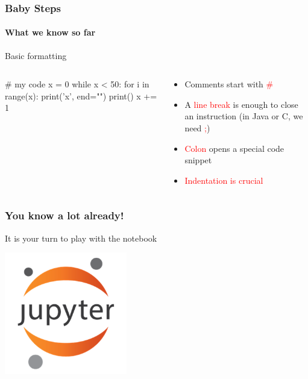 \documentclass{beamer}
\newcommand{\red}[1]{\textcolor{red}{#1}}
\begin{document}
\begin{frame}[fragile]
\frametitle{Baby Steps}
\framesubtitle{What we know so far}

\alert{Basic formatting}

\begin{columns}
\begin{column}{0.4\textwidth}
\begin{python}
# my code
x = 0            
while x < 50:
	for i in range(x):  
		print('x', end="")
	print()
	x += 1
\end{python}
\end{column}

\begin{column}{0.55\textwidth}
\begin{itemize}
\item Comments start with \red{\#}
\item A \red{line break} is enough to close an instruction (in Java or C, we 
need \red{;})
\item \red{Colon} opens a special code snippet
\item \red{Indentation is crucial}
\end{itemize}
\end{column}
\end{columns}
\end{frame}

\begin{frame}
\frametitle{You know a lot already!}

It is your turn to play with the notebook
\bigskip

\centering
\includegraphics[width=0.4\textwidth]{img/jupyter.png}
\end{frame}
% 
% 
% 
% 
% 
% 
% 
% 
% 
% 
\end{document}
